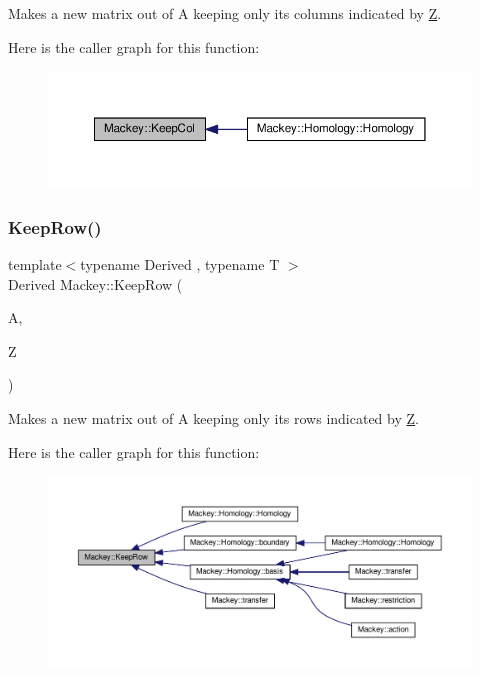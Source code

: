 Makes a new matrix out of A keeping only its columns indicated by \hyperlink{classZ}{Z}. 

Here is the caller graph for this function\+:\nopagebreak
\begin{figure}[H]
\begin{center}
\leavevmode
\includegraphics[width=350pt]{namespaceMackey_a782d9ce52543c3ae3520b4859dda3240_icgraph}
\end{center}
\end{figure}
\mbox{\label{namespaceMackey_ae44b27dcf905a7ff976ebc79f197c579}} 
\subsubsection{\texorpdfstring{Keep\+Row()}{KeepRow()}}
{\footnotesize\ttfamily template$<$typename Derived , typename T $>$ \\
Derived Mackey\+::\+Keep\+Row (\begin{DoxyParamCaption}\item[{const Eigen\+::\+Dense\+Base$<$ Derived $>$ \&}]{A,  }\item[{const std\+::vector$<$ T $>$ \&}]{Z }\end{DoxyParamCaption})}



Makes a new matrix out of A keeping only its rows indicated by \hyperlink{classZ}{Z}. 

Here is the caller graph for this function\+:\nopagebreak
\begin{figure}[H]
\begin{center}
\leavevmode
\includegraphics[width=350pt]{namespaceMackey_ae44b27dcf905a7ff976ebc79f197c579_icgraph}
\end{center}
\end{figure}
\mbox{\label{namespaceMackey_a5d8ae76ffb9440e27bfca124d26ee1b2}} 
